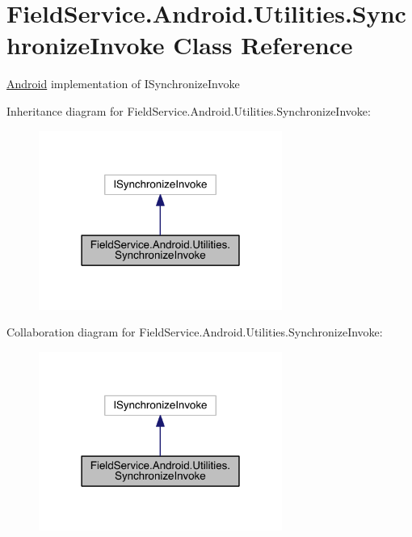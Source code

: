 \hypertarget{class_field_service_1_1_android_1_1_utilities_1_1_synchronize_invoke}{\section{Field\+Service.\+Android.\+Utilities.\+Synchronize\+Invoke Class Reference}
\label{class_field_service_1_1_android_1_1_utilities_1_1_synchronize_invoke}
}


\hyperlink{namespace_field_service_1_1_android}{Android} implementation of I\+Synchronize\+Invoke  




Inheritance diagram for Field\+Service.\+Android.\+Utilities.\+Synchronize\+Invoke\+:
\nopagebreak
\begin{figure}[H]
\begin{center}
\leavevmode
\includegraphics[width=226pt]{class_field_service_1_1_android_1_1_utilities_1_1_synchronize_invoke__inherit__graph}
\end{center}
\end{figure}


Collaboration diagram for Field\+Service.\+Android.\+Utilities.\+Synchronize\+Invoke\+:
\nopagebreak
\begin{figure}[H]
\begin{center}
\leavevmode
\includegraphics[width=226pt]{class_field_service_1_1_android_1_1_utilities_1_1_synchronize_invoke__coll__graph}
\end{center}
\end{figure}
